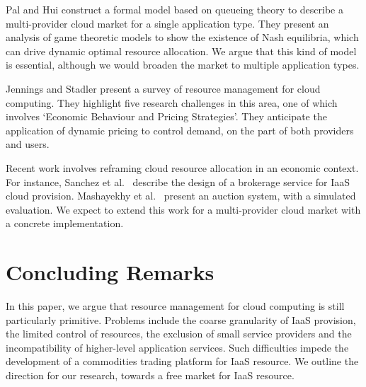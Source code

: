 \documentclass[conference,10pt]{IEEEtran}
\begin{document}
Pal and Hui \cite{pal13economic} construct a formal model based on queueing theory to describe a multi-provider cloud market for a single application type. They present an analysis of game theoretic models to show the existence of Nash equilibria, which can drive dynamic optimal resource allocation.
We argue that this kind of model is essential, although we would broaden the market to multiple application types.

Jennings and Stadler \cite{jennings15resource} present a survey of resource management for cloud computing. They highlight five research challenges in this area, one of which involves `Economic Behaviour and Pricing Strategies'. They anticipate the application of dynamic pricing to control demand, on the part of both providers and users.

Recent work involves reframing cloud resource allocation in an economic context.  For instance, Sanchez et al.\ 
\cite{sanchez14compatible} describe the design of a brokerage service for IaaS cloud provision. 
Mashayekhy et al.\ \cite{mashayekhy14two} present an auction system, with a simulated evaluation. We expect to extend this work for  a multi-provider cloud market  with a concrete implementation.


\section{Concluding Remarks}
\label{sec-concl}

In this paper, we argue that resource management for cloud computing is still particularly primitive. 
Problems include the coarse granularity of IaaS provision, the limited control of resources, the exclusion of small service providers and the incompatibility of higher-level application services.
Such difficulties impede the development of a commodities trading platform for IaaS resource. 
We outline the direction for our research, towards a free market for IaaS resource.





\end{document}
